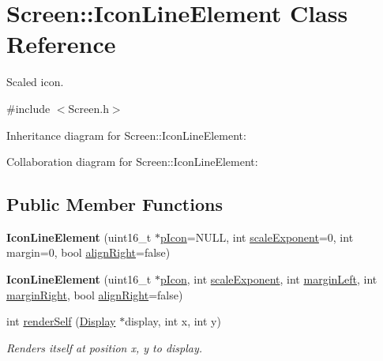 \hypertarget{classScreen_1_1IconLineElement}{}\section{Screen\+:\+:Icon\+Line\+Element Class Reference}
\label{classScreen_1_1IconLineElement}


Scaled icon.  




{\ttfamily \#include $<$Screen.\+h$>$}



Inheritance diagram for Screen\+:\+:Icon\+Line\+Element\+:


Collaboration diagram for Screen\+:\+:Icon\+Line\+Element\+:
\subsection*{Public Member Functions}
\begin{DoxyCompactItemize}
\item 
\mbox{\label{classScreen_1_1IconLineElement_ad465a9f557b9f7e659ebfb8a5a995ca6}} 
{\bfseries Icon\+Line\+Element} (uint16\+\_\+t $\ast$\mbox{\hyperlink{classScreen_1_1IconLineElement_ae84108a5bfda7ba013401c067a8c9aca}{p\+Icon}}=N\+U\+LL, int \mbox{\hyperlink{classScreen_1_1IconLineElement_a95ab319fab5abe27266a092fdb75b58e}{scale\+Exponent}}=0, int margin=0, bool \mbox{\hyperlink{classScreen_1_1LineElement_a0c5f4e33c2df1dce8e4e45b90dac1423}{align\+Right}}=false)
\item 
\mbox{\label{classScreen_1_1IconLineElement_a7bba2dffbe294ad65c4cda9d7e462bc6}} 
{\bfseries Icon\+Line\+Element} (uint16\+\_\+t $\ast$\mbox{\hyperlink{classScreen_1_1IconLineElement_ae84108a5bfda7ba013401c067a8c9aca}{p\+Icon}}, int \mbox{\hyperlink{classScreen_1_1IconLineElement_a95ab319fab5abe27266a092fdb75b58e}{scale\+Exponent}}, int \mbox{\hyperlink{classScreen_1_1LineElement_a9ed23f9510a11334af9be6f53965f7a6}{margin\+Left}}, int \mbox{\hyperlink{classScreen_1_1LineElement_a3a2077f01072be8e8fd0f4539b85beb0}{margin\+Right}}, bool \mbox{\hyperlink{classScreen_1_1LineElement_a0c5f4e33c2df1dce8e4e45b90dac1423}{align\+Right}}=false)
\item 
int \mbox{\hyperlink{classScreen_1_1IconLineElement_a3ee090b31ee5061974552be4688d937b}{render\+Self}} (\mbox{\hyperlink{classDisplay}{Display}} $\ast$display, int x, int y)
\begin{DoxyCompactList}\small\item\em Renders itself at position x, y to display. \end{DoxyCompactList}\end{DoxyCompactItemize}
